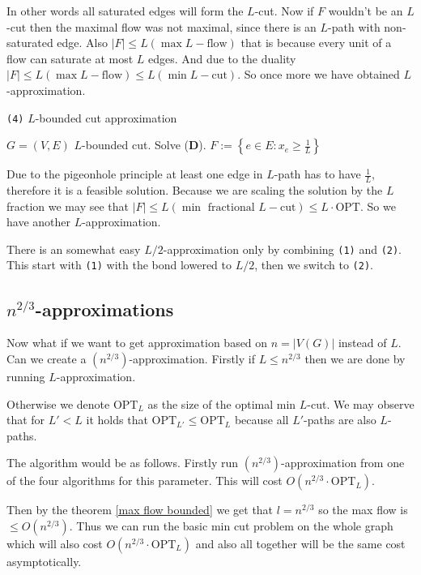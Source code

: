In other words all saturated edges will form the $L$-cut. Now if $F$ wouldn't be an $L$-cut then the maximal flow was not maximal, since there is an $L$-path with non-saturated edge. Also $|F| \leq L (\max L-\text{flow})$ that is because every unit of a flow can saturate at most $L$ edges. And due to the duality $|F| \leq L (\max L-\text{flow}) \leq L (\min L-\text{cut})$. So once more we have obtained $L$-approximation.

\begin{algorithm}
	\caption{ \texttt{(4)} $L$-bounded cut approximation}
	\begin{algorithmic}[1]
		\Require $G = (V,E)$
		\Ensure $L$-bounded cut.
		\State Solve (\textbf{D}).
		\State $F := \left\{e \in E: x_e \geq \frac{1}{L}\right\}$
	\end{algorithmic}
\end{algorithm}

Due to the pigeonhole principle at least one edge in $L$-path has to have $\frac{1}{L}$, therefore it is a feasible solution. Because we are scaling the solution by the $L$ fraction we may see that $|F| \leq L (\min \text{ fractional } L-\text{cut}) \leq L \cdot \text{OPT}$. So we have another $L$-approximation.

There is an somewhat easy $L/2$-approximation only by combining \texttt{(1)} and \texttt{(2)}. This start with \texttt{(1)} with the bond lowered to $L/2$, then we switch to \texttt{(2)}.

\subsection{$n^{2/3}$-approximations}

Now what if we want to get approximation based on $n = |V(G)|$ instead of $L$. Can we create a $(n^{2/3})$-approximation. Firstly if $L \leq n^{2/3}$ then we are done by running $L$-approximation.

Otherwise we denote $\text{OPT}_L$ as the size of the optimal min $L$-cut. We may observe that for $L' < L$ it holds that $\text{OPT}_{L'} \leq \text{OPT}_L$ because all $L'$-paths are also $L$-paths.

The algorithm would be as follows. Firstly run $(n^{2/3})$-approximation from one of the four algorithms for this parameter. This will cost $O(n^{2/3} \cdot \text{OPT}_L)$.

Then by the theorem \ref{max flow bounded} we get that $l = n^{2/3}$ so the max flow is $\leq O(n^{2/3})$. Thus we can run the basic min cut problem on the whole graph which will also cost $O(n^{2/3} \cdot \text{OPT}_L)$ and also all together will be the same cost asymptotically.

